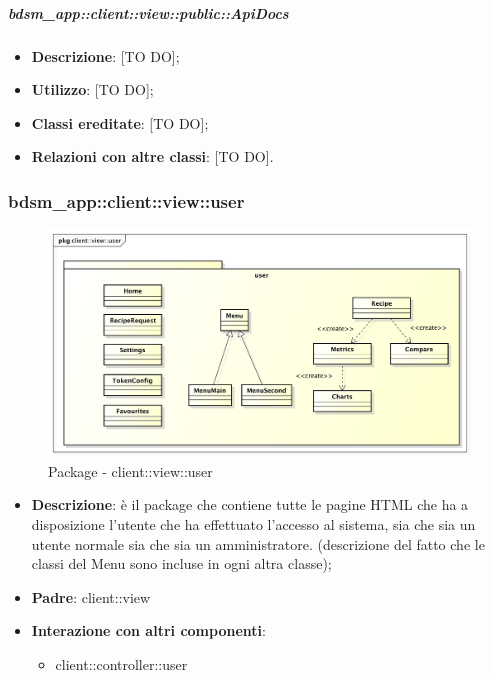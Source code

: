 			\subparagraph{bdsm\_app::client::view::public::ApiDocs} %
			\label{subp:bdsm_app_client_view_public_apidocs}
				\begin{itemize}
					\item \textbf{Descrizione}: [TO DO];
					\item \textbf{Utilizzo}: [TO DO];
					\item \textbf{Classi ereditate}: [TO DO];
					\item \textbf{Relazioni con altre classi}: [TO DO].
				\end{itemize}



	\subsubsection{bdsm\_app::client::view::user} %
	\label{ssub:bdsm_app_client_view_user}
	\begin{figure}[htbp]
		\centering
		\centerline{\includegraphics[scale=0.45]{./images/client_view_user.pdf}}
		\caption{Package - client::view::user}
	\end{figure}

	\begin{itemize}
		\item \textbf{Descrizione}: è il package che contiene tutte le pagine HTML che ha a disposizione l'utente che ha effettuato l'accesso al sistema, sia che sia un utente normale sia che sia un amministratore. \newline
		[TO DO] (descrizione del fatto che le classi del Menu sono incluse in ogni altra classe);
		\item \textbf{Padre}: client::view
		\item \textbf{Interazione con altri componenti}:
			\begin{itemize}
				\item client::controller::user
			\end{itemize}
	\end{itemize}

